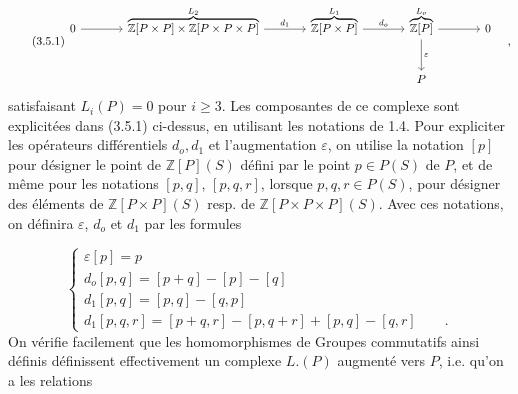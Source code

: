 \begin{equation}\tag{3.5.1}
\begin{tikzcd}[column sep=large, row sep=large]
0 \arrow[r] & \overbrace{\mathbb{Z}[P\times P]\times\mathbb{Z}[P\times P\times P]}^{L_2} \arrow[r, "d_1"] & \overbrace{\mathbb{Z}[P\times P]}^{L_1} \arrow[r, "d_o"] & \overbrace{\mathbb{Z}[P]}^{L_o} \arrow[r] \arrow[d, "\varepsilon"] & 0 \\
& & & P &
\end{tikzcd}\quad ,
\end{equation}
 satisfaisant $L_i(P)=0$ pour $i \geq 3$. Les composantes de ce complexe sont explicitées dans (3.5.1) ci-dessus, en utilisant les notations de 1.4. Pour expliciter les opérateurs différentiels $d_o,d_1$ et l'augmentation $\varepsilon$, on utilise la notation $[p]$ pour désigner le point de $\mathbb{Z}[P](S)$ défini par le point $p \in P(S)$ de $P$, et de même pour les notations $[p,q]$, $[p,q,r]$, lorsque $p,q,r \in P(S)$, pour désigner des éléments de $\mathbb{Z}[P\times P](S)$ resp. de $\mathbb{Z}[P\times P\times P](S)$. Avec ces notations, on définira $\varepsilon$, $d_o$ et $d_1$ par les formules

\begin{equation}\tag{3.5.2}
\left\{
\begin{array}{l}
\varepsilon[p] = p \\[1.5ex]
d_o[p,q]= [p+q] - [p] - [q] \\[1.5ex]
d_1[p,q]= [p,q] - [q,p] \\[1.5ex]
d_1[p,q,r] = [p+q,r] - [p,q+r] + [p,q] - [q,r] \qquad .
\end{array}
\right.
\end{equation}
On vérifie facilement que les homomorphismes de Groupes commutatifs ainsi définis définissent effectivement un complexe $L.(P)$ augmenté vers $P$, i.e. qu'on a les relations

